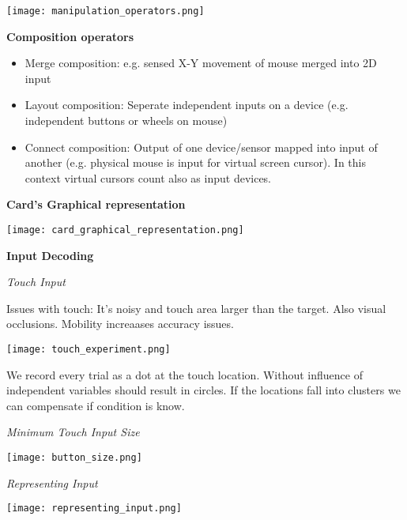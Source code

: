 \begin{center}
	\texttt{[image: manipulation\_operators.png]}
\end{center}

\textbf{Composition operators} \smallskip

\begin{itemize}[itemsep=-5pt, topsep=0pt, leftmargin=*]
	\item Merge composition: e.g. sensed X-Y movement of mouse merged into 2D input
	\item Layout composition: Seperate independent inputs on a device (e.g. independent buttons or wheels on mouse)
	\item Connect composition: Output of one device/sensor mapped into input of another (e.g. physical mouse is input for virtual screen cursor). In this context virtual cursors count also as input devices. 
\end{itemize}

\textbf{Card's Graphical representation} \smallskip


\begin{center}
	\texttt{[image: card\_graphical\_representation.png]}
\end{center}


\textbf{Input Decoding} \smallskip

\textit{Touch Input} \smallskip

Issues with touch: It's noisy and touch area larger than the target. Also visual occlusions. Mobility increaases accuracy issues. 

\begin{center}
	\texttt{[image: touch\_experiment.png]}
\end{center}

We record every trial as a dot at the touch location. Without influence of independent variables should result in circles. If the locations fall into clusters we can compensate if condition is know. \medskip

\textit{Minimum Touch Input Size}

\begin{center}
	\texttt{[image: button\_size.png]}
\end{center}

\textit{Representing Input} \smallskip


\begin{center}
	\texttt{[image: representing\_input.png]}
\end{center}

